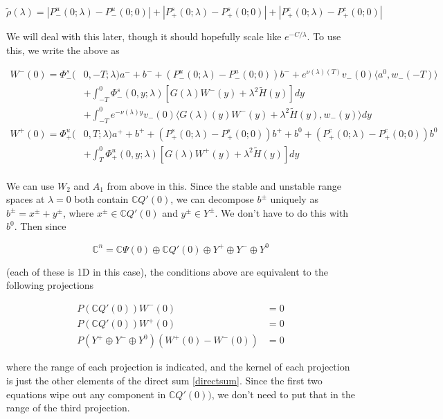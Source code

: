\documentclass[12pt]{article}
\def\C{{\mathbb C}}
\begin{document}
\begin{enumerate}
\[
\tilde{\rho}(\lambda) = |P^u_-(0;\lambda) - P^u_-(0; 0)| + |P^s_+(0;\lambda) - P^s_+(0;0)| + |P^c_+(0;\lambda) - P^c_+(0;0)|
\]

We will deal with this later, though it should hopefully scale like $e^{-C/\lambda}$. To use this, we write the above as

\begin{align*}
W^-(0) = \Phi^s_-(&0, -T; \lambda)a^- + b^- + (P^u_-(0;\lambda) - P^u_-(0; 0))b^- + e^{\nu(\lambda)(T)} v_-(0) \langle a^0, w_-(-T) \rangle \\
&+ \int_{-T}^0 \Phi^s_-(0, y; \lambda) [ G(\lambda)W^-(y) + \lambda^2 \tilde{H}(y) ] dy \\
&+ \int_{-T}^0 
e^{-\nu(\lambda)y} v_-(0) \langle G(\lambda)(y)W^-(y) + \lambda^2 \tilde{H}(y), w_-(y) \rangle dy \\
W^+(0) = \Phi^u_+(&0, T; \lambda)a^+ + b^+ + (P^s_+(0;\lambda) - P^s_+(0;0))b^+ + b^0 + (P^c_+(0;\lambda) - P^c_+(0;0))b^0 \\
&+ \int_T^0 \Phi^u_+(0, y; \lambda) [ G(\lambda)W^+(y) + \lambda^2 \tilde{H}(y) ] dy \\
\end{align*}

We can use $W_2$ and $A_1$ from above in this. Since the stable and unstable range spaces at $\lambda = 0$ both contain $\C Q'(0)$, we can decompose $b^\pm$ uniquely as $b^\pm = x^\pm + y^\pm$, where $x^\pm \in \C Q'(0)$ and $y^\pm \in Y^\pm$. We don't have to do this with $b^0$. Then since

\begin{equation}\label{directsum}
\C^n = \C\Psi(0) \oplus \C Q'(0) \oplus Y^+ \oplus Y^- \oplus Y^0
\end{equation}

(each of these is 1D in this case), the conditions above are equivalent to the following projections

\begin{align*}
P(\C Q'(0))W^-(0) &= 0 \\
P(\C Q'(0))W^+(0) &= 0 \\
P(Y^+ \oplus Y^- \oplus Y^0) (W^+(0) - W^-(0) ) &= 0
\end{align*}

where the range of each projection is indicated, and the kernel of each projection is just the other elements of the direct sum \eqref{directsum}. Since the first two equations wipe out any component in $\C Q'(0))$, we don't need to put that in the range of the third projection.\\


\end{enumerate}
\end{document}

